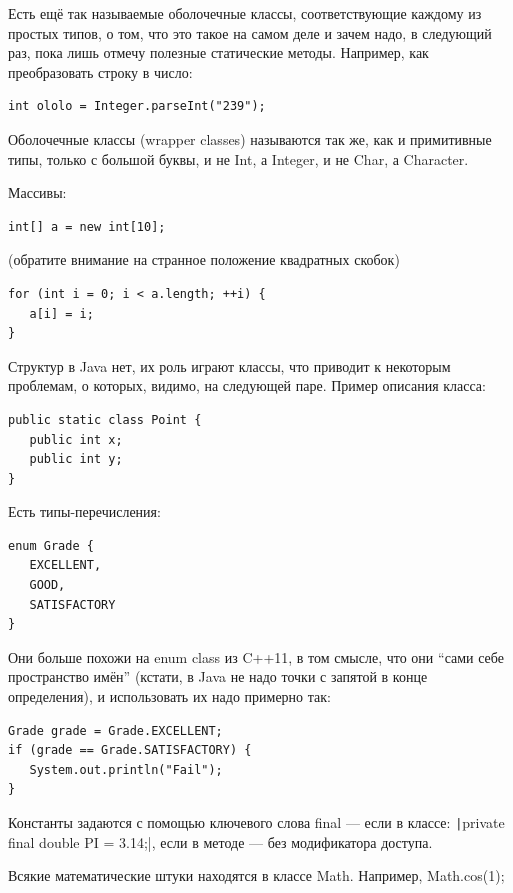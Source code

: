 \documentclass[a5paper]{article}
\begin{document}
Есть ещё так называемые оболочечные классы, соответствующие каждому из простых типов, о том, что это такое на самом деле и зачем надо, в следующий раз, пока лишь отмечу полезные статические методы. Например, как преобразовать строку в число:

\begin{verbatim}
int ololo = Integer.parseInt("239");
\end{verbatim}

Оболочечные классы (wrapper classes) называются так же, как и примитивные типы, только с большой буквы, и не Int, а Integer, и не Char, а Character.

Массивы: 

\begin{verbatim}
int[] a = new int[10]; 
\end{verbatim}

(обратите внимание на странное положение квадратных скобок)

\begin{verbatim}
for (int i = 0; i < a.length; ++i) {
   a[i] = i;
}
\end{verbatim}

Структур в Java нет, их роль играют классы, что приводит к некоторым проблемам, о которых, видимо, на следующей паре. Пример описания класса:

\begin{verbatim}
public static class Point {
   public int x;
   public int y;
}
\end{verbatim}

Есть типы-перечисления:

\begin{verbatim}
enum Grade {
   EXCELLENT,
   GOOD,
   SATISFACTORY
}
\end{verbatim}

Они больше похожи на enum class из C++11, в том смысле, что они ``сами себе пространство имён'' (кстати, в Java не надо точки с запятой в конце определения), и использовать их надо примерно так:

\begin{verbatim}
Grade grade = Grade.EXCELLENT;
if (grade == Grade.SATISFACTORY) {
   System.out.println("Fail");
}
\end{verbatim}

Константы задаются с помощью ключевого слова final --- если в классе: \texttt|private final double PI = 3.14;|, если в методе --- без модификатора доступа.

Всякие математические штуки находятся в классе Math. Например, Math.cos(1);
\end{document}
